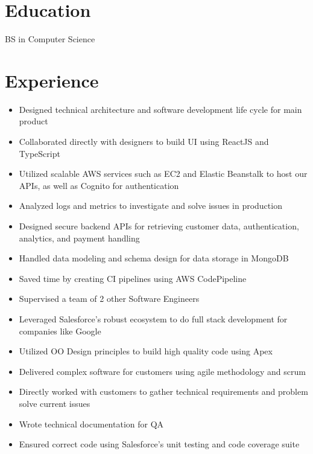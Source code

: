 \documentclass{cv}
\begin{document}

	\section{Education}
	BS in Computer Science

	\section{Experience}
	\begin{itemize}
		\item Designed technical architecture and software development life cycle for main product
		\item Collaborated directly with designers to build UI using ReactJS and TypeScript
		\item Utilized scalable AWS services such as EC2 and Elastic Beanstalk to host our APIs, as well as Cognito for authentication
		\item Analyzed logs and metrics to investigate and solve issues in production
		\item Designed secure backend APIs for retrieving customer data, authentication, analytics, and payment handling
		\item Handled data modeling and schema design for data storage in MongoDB
		\item Saved time by creating CI pipelines using AWS CodePipeline
		\item Supervised a team of 2 other Software Engineers
	\end{itemize}

	\begin{itemize}
		\item Leveraged Salesforce's robust ecosystem to do full stack development for companies like Google
		\item Utilized OO Design principles to build high quality code using Apex
		\item Delivered complex software for customers using agile methodology and scrum
		\item Directly worked with customers to gather technical requirements and problem solve current issues
		\item Wrote technical documentation for QA
		\item Ensured correct code using Salesforce's unit testing and code coverage suite
	\end{itemize}
\end{document}
